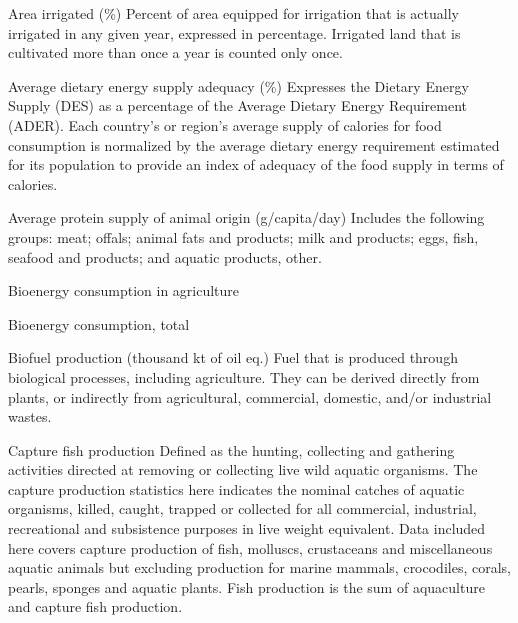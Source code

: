 \begin{MetadataCollection} {}
\begin{metadata}{Area irrigated (\%)} {}
Percent of area equipped for irrigation that is actually irrigated in any given year, expressed in percentage. Irrigated land that is cultivated more than once a year is counted only once.
\end{metadata}

\begin{metadata}{Average dietary energy supply adequacy (\%)} {}
Expresses the Dietary Energy Supply (DES) as a percentage of the Average Dietary Energy Requirement (ADER). Each country's or region's average supply of calories for food consumption is normalized by the average dietary energy requirement estimated for its population to provide an index of adequacy of the food supply in terms of calories.
\end{metadata}

\begin{metadata}{Average protein supply of animal origin (g/capita/day)} {}
Includes the following groups: meat; offals; animal fats and products; milk and products; eggs, fish, seafood and products; and aquatic products, other. 
\end{metadata}

\begin{metadata}{Bioenergy consumption in agriculture} {}\end{metadata}
\begin{metadata}{Bioenergy consumption, total} {}\end{metadata}

\begin{metadata}{Biofuel production (thousand kt of oil eq.)} {}
Fuel that is produced through biological processes, including agriculture. They can be derived directly from plants, or indirectly from agricultural, commercial, domestic, and/or industrial wastes.
\end{metadata}

\begin{metadata}{Capture fish production} {}
Defined as the hunting, collecting and gathering activities directed at removing or collecting live wild aquatic organisms. The capture production statistics here indicates the nominal catches of aquatic organisms, killed, caught, trapped or collected for all commercial, industrial, recreational and subsistence purposes in live weight equivalent. Data included here covers capture production of fish, molluscs, crustaceans and miscellaneous aquatic animals but excluding production for marine mammals, crocodiles, corals, pearls, sponges and aquatic plants. Fish production is the sum of aquaculture and capture fish production.
\end{metadata}


\end{MetadataCollection}
